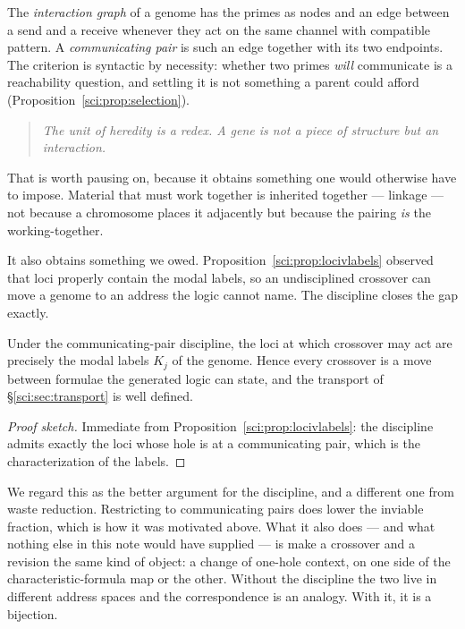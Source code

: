 \begin{definition}
\label{sci:def:intgraph}
The \emph{interaction graph} of a genome has the primes as nodes and an edge between a send and a
receive whenever they act on the same channel with compatible pattern. A \emph{communicating pair} is
such an edge together with its two endpoints. The criterion is syntactic by necessity: whether two
primes \emph{will} communicate is a reachability question, and settling it is not something a parent
could afford (Proposition~\ref{sci:prop:selection}).
\end{definition}

\begin{quote}
\itshape The unit of heredity is a redex. A gene is not a piece of structure but an interaction.
\end{quote}

That is worth pausing on, because it obtains something one would otherwise have to impose. Material
that must work together is inherited together --- linkage --- not because a chromosome places it
adjacently but because the pairing \emph{is} the working-together.

It also obtains something we owed. Proposition~\ref{sci:prop:locivlabels} observed that loci properly
contain the modal labels, so an undisciplined crossover can move a genome to an address the logic
cannot name. The discipline closes the gap exactly.

\begin{proposition}
\label{sci:prop:alignment}
Under the communicating-pair discipline, the loci at which crossover may act are precisely the
modal labels $K_j$ of the genome. Hence every crossover is a move between formulae the generated
logic can state, and the transport of \S\ref{sci:sec:transport} is well defined.
\end{proposition}
\begin{proof}[Proof sketch]
Immediate from Proposition~\ref{sci:prop:locivlabels}: the discipline admits exactly the loci whose
hole is at a communicating pair, which is the characterization of the labels.
\end{proof}

We regard this as the better argument for the discipline, and a different one from waste reduction.
Restricting to communicating pairs does lower the inviable fraction, which is how it was motivated
above. What it also does --- and what nothing else in this note would have supplied --- is make a
crossover and a revision the same kind of object: a change of one-hole context, on one side of the
characteristic-formula map or the other. Without the discipline the two live in different address
spaces and the correspondence is an analogy. With it, it is a bijection.


